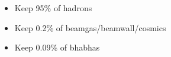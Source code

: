 
\begin{slide*}
\slideframe{}
\begin{minipage}[t]{\linewidth}
\Large

\vspace{0.2cm}

\begin{itemize}

  \item Keep 95\% of hadrons

  \item Keep 0.2\% of beamgas/beamwall/cosmics

  \item Keep 0.09\% of bhabhas

\end{itemize}

\begin{center}
   \\
  \vspace{0.5cm}
   \\
\end{center}

\end{minipage}
\end{slide*}


